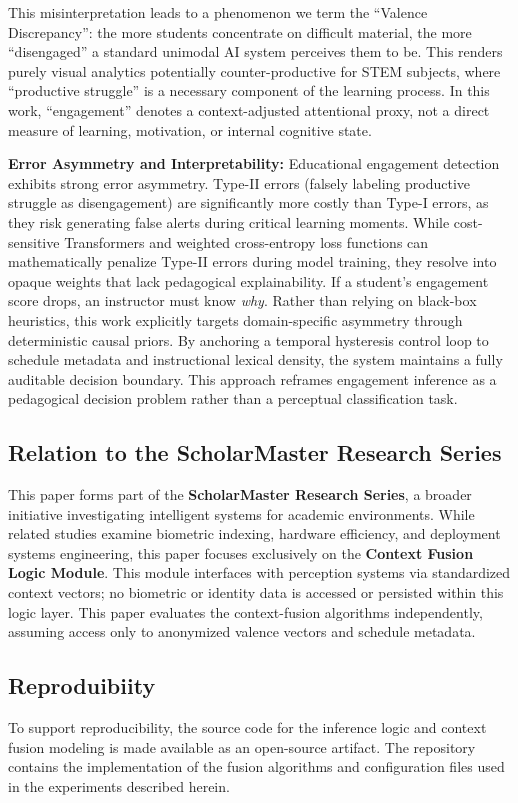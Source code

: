 \documentclass[conference]{IEEEtran}
\begin{document}
This misinterpretation leads to a phenomenon we term the ``Valence Discrepancy'': the more students concentrate on difficult material, the more ``disengaged'' a standard unimodal AI system perceives them to be. This renders purely visual analytics potentially counter-productive for STEM subjects, where ``productive struggle'' is a necessary component of the learning process. In this work, ``engagement'' denotes a context-adjusted attentional proxy, not a direct measure of learning, motivation, or internal cognitive state.

\textbf{Error Asymmetry and Interpretability:} Educational engagement detection exhibits strong error asymmetry. Type-II errors (falsely labeling productive struggle as disengagement) are significantly more costly than Type-I errors, as they risk generating false alerts during critical learning moments. While cost-sensitive Transformers and weighted cross-entropy loss functions can mathematically penalize Type-II errors during model training, they resolve into opaque weights that lack pedagogical explainability. If a student's engagement score drops, an instructor must know \textit{why}. Rather than relying on black-box heuristics, this work explicitly targets domain-specific asymmetry through deterministic causal priors. By anchoring a temporal hysteresis control loop to schedule metadata and instructional lexical density, the system maintains a fully auditable decision boundary. This approach reframes engagement inference as a pedagogical decision problem rather than a perceptual classification task.

\subsection{Relation to the ScholarMaster Research Series}
This paper forms part of the \textbf{ScholarMaster Research Series}, a broader initiative investigating intelligent systems for academic environments. While related studies examine biometric indexing, hardware efficiency, and deployment systems engineering, this paper focuses exclusively on the \textbf{Context Fusion Logic Module}. This module interfaces with perception systems via standardized context vectors; no biometric or identity data is accessed or persisted within this logic layer. This paper evaluates the context-fusion algorithms independently, assuming access only to anonymized valence vectors and schedule metadata.

\subsection{Reproduibiity}
To support reproducibility, the source code for the inference logic and context fusion modeling is made available as an open-source artifact. The repository contains the implementation of the fusion algorithms and configuration files used in the experiments described herein.
\end{document}
